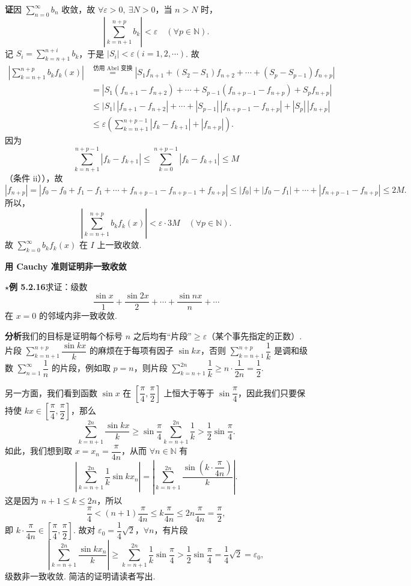 \documentclass[UTF8, 12pt, fontset=fandol, oneside]{ctexart}
\begin{document}
\noindent\textbf{证}\quad 因 $\displaystyle\sum_{n=0}^{\infty}b_n$ 收敛，故
$\forall\varepsilon>0,\ \exists N>0$，当 $n>N$ 时，
\[
  \left|\sum_{k=n+1}^{n+p}b_k\right|<\varepsilon\quad(\forall p\in\mathbb N).
\]
记 $S_i=\displaystyle\sum_{k=n+1}^{n+i}b_k$，于是
$|S_i|<\varepsilon(i=1,2,\cdots)$. 故
\[
\begin{aligned}
\left|\sum_{k=n+1}^{n+p}b_kf_k(x)\right|
&\stackrel{\text{仿用 Abel 变换}}{=}
\left|S_1f_{n+1}+(S_2-S_1)f_{n+2}+\cdots+(S_p-S_{p-1})f_{n+p}\right|\\
&=\left|S_1(f_{n+1}-f_{n+2})+\cdots+S_{p-1}(f_{n+p-1}-f_{n+p})+S_pf_{n+p}\right|\\
&\le |S_1|\,|f_{n+1}-f_{n+2}|+\cdots+|S_{p-1}|\,|f_{n+p-1}-f_{n+p}|+|S_p|\,|f_{n+p}|\\
&\le\varepsilon\left(\sum_{k=n+1}^{n+p-1}|f_k-f_{k+1}|+|f_{n+p}|\right).
\end{aligned}
\]
因为
\[
  \sum_{k=n+1}^{n+p-1}|f_k-f_{k+1}|
  \le\sum_{k=0}^{n+p-1}|f_k-f_{k+1}|\le M
\]
（条件 ii）），故
\[
  |f_{n+p}|=|f_0-f_0+f_1-f_1+\cdots+f_{n+p-1}-f_{n+p-1}+f_{n+p}|
  \le |f_0|+|f_0-f_1|+\cdots+|f_{n+p-1}-f_{n+p}|\le2M.
\]
所以，
\[
  \left|\sum_{k=n+1}^{n+p}b_kf_k(x)\right|<\varepsilon\cdot3M\quad(\forall p\in\mathbb N).
\]
故 $\displaystyle\sum_{k=0}^{\infty}b_kf_k(x)$ 在 $I$ 上一致收敛.

\noindent\textbf{用 Cauchy 准则证明非一致收敛}

\noindent\textbf{$\star$例 5.2.16}\quad 求证：级数
\[
  \frac{\sin x}{1}+\frac{\sin2x}{2}+\cdots+\frac{\sin nx}{n}+\cdots
\]
在 $x=0$ 的邻域内非一致收敛.

\noindent\textbf{分析}\quad 我们的目标是证明每个标号 $n$ 之后均有“片段”$\ge\varepsilon$（某个事先指定的正数）. 片段
$\displaystyle\sum_{k=n+1}^{n+p}\dfrac{\sin kx}{k}$ 的麻烦在于每项有因子 $\sin kx$，否则
$\displaystyle\sum_{k=n+1}^{n+p}\dfrac1k$ 是调和级数 $\displaystyle\sum_{n=1}^{\infty}\dfrac1n$ 的片段，例如取
$p=n$，则片段 $\displaystyle\sum_{k=n+1}^{2n}\dfrac1k\ge n\cdot\dfrac1{2n}=\dfrac12$.

另一方面，我们看到函数 $\sin x$ 在 $\left[\dfrac{\pi}{4},\dfrac{\pi}{2}\right]$ 上恒大于等于
$\sin\dfrac{\pi}{4}$，因此我们只要保持使
$kx\in\left[\dfrac{\pi}{4},\dfrac{\pi}{2}\right]$，那么
\[
  \sum_{k=n+1}^{2n}\frac{\sin kx}{k}
  \ge \sin\frac{\pi}{4}\sum_{k=n+1}^{2n}\frac1k
  >\frac12\sin\frac{\pi}{4}.
\]
如此，我们想到取 $x=x_n=\dfrac{\pi}{4n}$，从而 $\forall n\in\mathbb N$ 有
\[
  \left|\sum_{k=n+1}^{2n}\frac1k\sin kx_n\right|
  =\left|\sum_{k=n+1}^{2n}\frac{\sin\left(k\cdot\dfrac{\pi}{4n}\right)}{k}\right|.
\]
这是因为 $n+1\le k\le2n$，所以
\[
  \frac{\pi}{4}<(n+1)\frac{\pi}{4n}\le k\frac{\pi}{4n}\le2n\frac{\pi}{4n}=\frac{\pi}{2},
\]
即 $k\cdot\dfrac{\pi}{4n}\in\left[\dfrac{\pi}{4},\dfrac{\pi}{2}\right]$. 故对
$\varepsilon_0=\dfrac14\sqrt2$，$\forall n$，有片段
\[
  \left|\sum_{k=n+1}^{2n}\frac{\sin kx_n}{k}\right|
  \ge \sum_{k=n+1}^{2n}\frac1k\sin\frac{\pi}{4}
  >\frac12\sin\frac{\pi}{4}=\frac14\sqrt2=\varepsilon_0,
\]
级数非一致收敛. 简洁的证明请读者写出.
\end{document}
